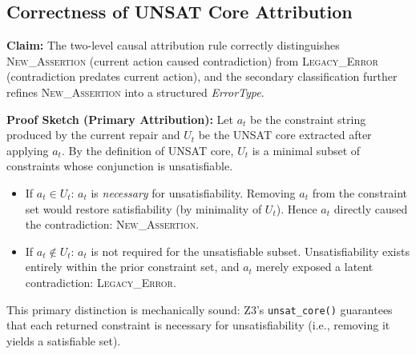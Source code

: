 \subsection{Correctness of UNSAT Core Attribution}

\textbf{Claim:} The two-level causal attribution rule correctly distinguishes \textsc{New\_Assertion} (current action caused contradiction) from \textsc{Legacy\_Error} (contradiction predates current action), and the secondary classification further refines \textsc{New\_Assertion} into a structured \textit{ErrorType}.

\textbf{Proof Sketch (Primary Attribution):}
Let $a_t$ be the constraint string produced by the current repair and $U_t$ be the UNSAT core extracted after applying $a_t$.  By the definition of UNSAT core, $U_t$ is a minimal subset of constraints whose conjunction is unsatisfiable.

\begin{itemize}
    \item If $a_t \in U_t$: $a_t$ is \emph{necessary} for unsatisfiability. Removing $a_t$ from the constraint set would restore satisfiability (by minimality of $U_t$). Hence $a_t$ directly caused the contradiction: \textsc{New\_Assertion}.
    \item If $a_t \notin U_t$: $a_t$ is not required for the unsatisfiable subset. Unsatisfiability exists entirely within the prior constraint set, and $a_t$ merely exposed a latent contradiction: \textsc{Legacy\_Error}.
\end{itemize}

This primary distinction is mechanically sound: Z3's \texttt{unsat\_core()} guarantees that each returned constraint is necessary for unsatisfiability (i.e., removing it yields a satisfiable set).

